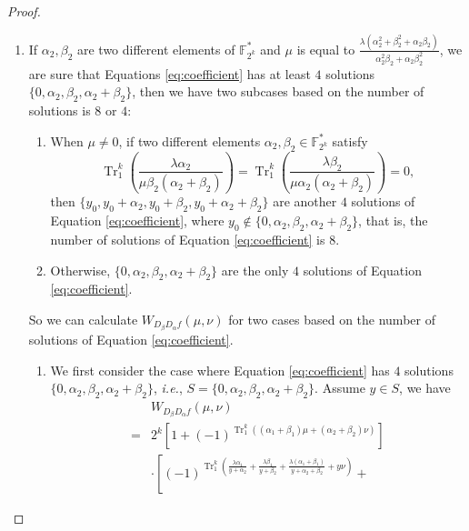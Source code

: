 \documentclass{article}
\newcommand{\F}{\mathbb{F}}
\newcommand{\0}{\textbf{0}}
\newcommand{\1}{\textbf{1}}
\newcommand{\TRACE}{\operatorname{Tr}_1^k}
\theoremstyle{plain}
\begin{document}
\begin{proof}
\begin{enumerate}[label=\textbf{Case \arabic*},wide = 0pt]
            \item If $\alpha_2,\beta_2$ are two different elements of $\F_{2^k}^*$ and $\mu$ is equal to $\frac{\lambda(\alpha_2^2+\beta_2^2+\alpha_2\beta_2)}{\alpha_2^2\beta_2+\alpha_2\beta_2^2}$,
            we are sure that Equations \eqref{eq:coefficient} has at least $4$ solutions $\{0,\alpha_2,\beta_2,\alpha_2+\beta_2\}$, then we have two subcases based on the number of solutions is $8$ or $4$:
            \begin{enumerate}[label=(\arabic{*})]
                \item When $\mu\ne 0$, if two different elements $\alpha_2,\beta_2\in\F_{2^k}^*$ satisfy
                \begin{equation}\label{eq:last_four_solution_condition}
                    \TRACE\left(\frac{\lambda\alpha_2}{\mu\beta_2(\alpha_2+\beta_2)}\right)=\TRACE\left(\frac{\lambda\beta_2}{\mu\alpha_2(\alpha_2+\beta_2)}\right)=0,
                \end{equation}
                then $\{y_0,y_0+\alpha_2,y_0+\beta_2,y_0+\alpha_2+\beta_2\}$ are another $4$ solutions of Equation \eqref{eq:coefficient}, where $y_0\notin\{0,\alpha_2,\beta_2,\alpha_2+\beta_2\}$, that is, the number of solutions of Equation \eqref{eq:coefficient} is $8$.
                \item Otherwise, $\{0,\alpha_2,\beta_2,\alpha_2+\beta_2\}$ are the only $4$ solutions of Equation \eqref{eq:coefficient}.
            \end{enumerate}
            So we can calculate $W_{D_{\beta}D_{\alpha}f}(\mu,\nu)$ for two cases based on the number of solutions of Equation \eqref{eq:coefficient}.
            \begin{enumerate}[label=\textbf{Subcase \Alph{*}},itemindent=*,wide=\parindent]
                \item We first consider the case where Equation \eqref{eq:coefficient} has $4$ solutions
                $\{0,\alpha_2,\beta_2,\alpha_2+\beta_2\}$, \emph{i.e.}, $S=\{0,\alpha_2,\beta_2,\alpha_2+\beta_2\}$.
                Assume $y\in S$, we have
                \begin{align}\label{eq:simpleforms_4}
                    &W_{D_{\beta}D_{\alpha}f}(\mu,\nu)\nonumber\\
                    =&2^k\left[1+(-1)^{\TRACE\left((\alpha_1+\beta_1)\mu+ (\alpha_2+\beta_2)\nu\right)}\right]\nonumber\\
                    &\cdot
                    \left[(-1)^{\TRACE\left(\frac{\lambda\alpha_1}{y+\alpha_2}+\frac{\lambda\beta_1}{y+\beta_2}+\frac{\lambda(\alpha_1+\beta_1)}{y+\alpha_2+\beta_2}+ y\nu\right)}+

\end{align}
\end{enumerate}
\end{enumerate}
\end{proof}
\end{document}
